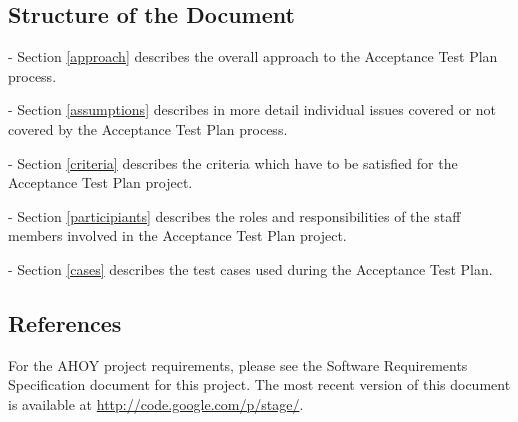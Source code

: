 \documentclass[titlepage]{article}
\begin{document}
\subsection{Structure of the Document%
    \label{structure}%
}
    \begin{itemize*}
        \item[-]Section \ref{approach} describes the overall approach to the Acceptance Test Plan process.
        \item[-]Section \ref{assumptions} describes in more detail individual issues covered or not covered by the Acceptance Test Plan process.
        \item[-]Section \ref{criteria} describes the criteria which have to be satisfied for the Acceptance Test Plan project.
        \item[-]Section \ref{participiants} describes the roles and responsibilities of the staff members involved in the Acceptance Test Plan project.
        \item[-]Section \ref{cases} describes the test cases used during the Acceptance Test Plan.
    \end{itemize*}


\subsection{References%
    \label{references}%
}
    For the AHOY project requirements, please see the Software Requirements Specification document for this project. The most recent version of this document is available at \url{http://code.google.com/p/stage/}.

\end{document}
